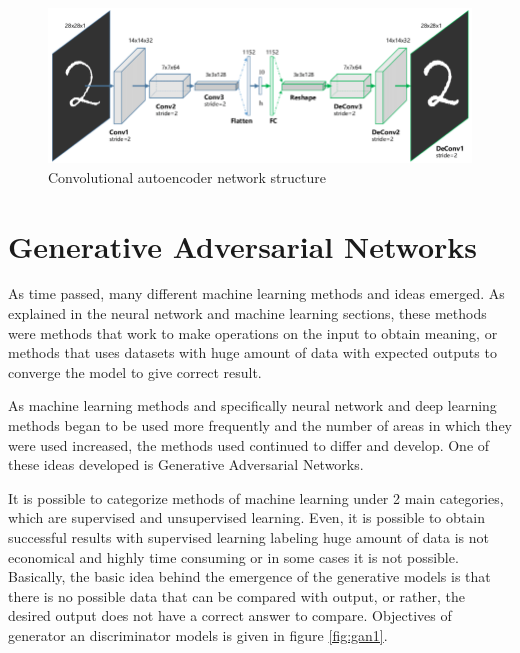 \begin{figure}[h]
    \centering
    \includegraphics[width=13cm]{figures/chapter3/mnist_autoencoder.png}
    \vspace*{3mm}
    \caption{Convolutional autoencoder network structure \cite{autoencoders}}
    \label{fig:mnist_autoencoder}
\end{figure}

\section{Generative Adversarial Networks}

As time passed, many different machine learning methods and ideas emerged. As explained in the neural network and machine learning sections, these methods were methods that work to make operations on the input to obtain meaning, or methods that uses datasets with huge amount of data with expected outputs to converge the model to give correct result.

As machine learning methods and specifically neural network and deep learning methods began to be used more frequently and the number of areas in which they were used increased, the methods used continued to differ and develop. One of these ideas developed is Generative Adversarial Networks.

It is possible to categorize methods of machine learning under 2 main categories, which are supervised and unsupervised learning. Even, it is possible to obtain successful results with supervised learning labeling huge amount of data is not economical and highly time consuming or in some cases it is not possible. Basically, the basic idea behind the emergence of the generative models is that there is no possible data that can be compared with output, or rather, the desired output does not have a correct answer to compare. Objectives of generator an discriminator models is given in figure \ref{fig:gan1}.

